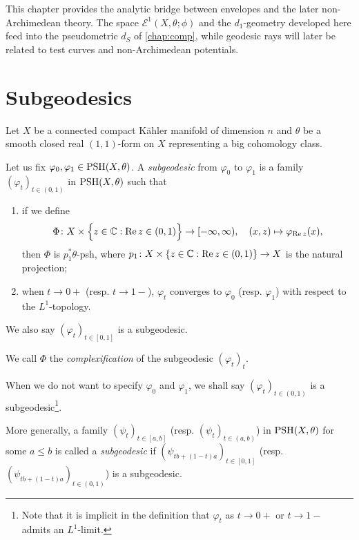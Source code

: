 This chapter provides the analytic bridge between envelopes and the later non-Archimedean theory. The space $\mathcal E^1(X,\theta;\phi)$ and the $d_1$-geometry developed here feed into the pseudometric $d_S$ of \cref{chap:comp}, while geodesic rays will later be related to test curves and non-Archimedean potentials.


\section{Subgeodesics}\label{sec:subgeo}
Let $X$ be a connected compact Kähler manifold of dimension $n$ and $\theta$ be a smooth closed real $(1,1)$-form on $X$ representing a big cohomology class.

\begin{definition}\label{def:subgeod}
    Let us fix $\varphi_0,\varphi_1\in \mathrm{PSH}(X,\theta)$. A \emph{subgeodesic} from $\varphi_0$ to $\varphi_1$ is a family $(\varphi_t)_{t\in (0,1)}$ in $\mathrm{PSH}(X,\theta)$ such that
    \begin{enumerate}
        \item\label{itm:def:subgeod:1} if we define
            \[
                \Phi\colon X\times \Bigl\{z\in \mathbb{C}:\operatorname{Re} z\in (0,1) \Bigr\}\rightarrow [-\infty,\infty),\quad (x,z)\mapsto \varphi_{\operatorname{Re} z}(x),
            \]
            then $\Phi$ is $p_1^*\theta$-psh, where $p_1\colon X\times \{z\in \mathbb{C}:\operatorname{Re} z\in (0,1)\}\rightarrow X$ is the natural projection;
        \item\label{itm:def:subgeod:2} when $t\to 0+$ (resp. $t\to 1-$), $\varphi_t$ converges to $\varphi_0$ (resp. $\varphi_1$) with respect to the $L^1$-topology.
    \end{enumerate}
    We also say $(\varphi_t)_{t\in [0,1]}$ is a subgeodesic.

    We call $\Phi$ the \emph{complexification} of the subgeodesic $(\varphi_t)_t$.
\end{definition}
When we do not want to specify $\varphi_0$ and $\varphi_1$, we shall say $(\varphi_t)_{t\in (0,1)}$ is a subgeodesic\footnote{Note that it is implicit in the definition that $\varphi_t$ as $t\to 0+$ or $t\to 1-$ admits an $L^1$-limit.}.

More generally, a family $(\psi_t)_{t\in [a,b]}$ (resp. $(\psi_t)_{t\in (a,b)}$) in $\mathrm{PSH}(X,\theta)$ for some $a\leq b$ is called a \emph{subgeodesic} if $(\psi_{tb+(1-t)a})_{t\in [0,1]}$ (resp. $(\psi_{tb+(1-t)a})_{t\in (0,1)}$) is a subgeodesic.


